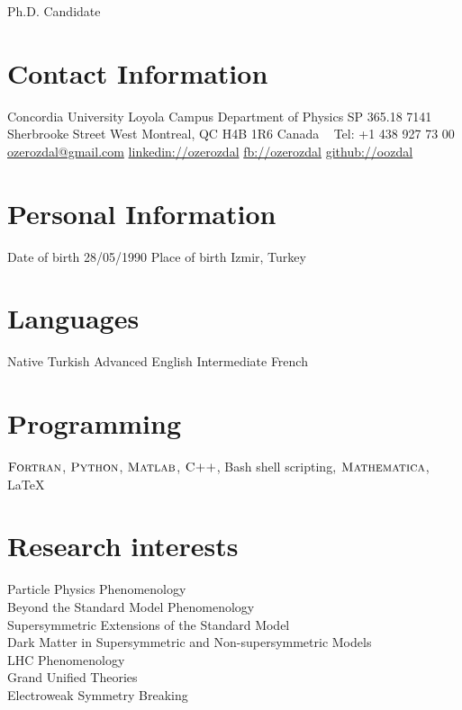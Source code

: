 \documentclass[]{friggeri-cv}
\begin{document}
       {Ph.D. Candidate}


\begin{aside}
  \section{Contact Information}
    Concordia University
    Loyola Campus
    Department of Physics SP 365.18
    7141 Sherbrooke Street West
    Montreal, QC  H4B 1R6
    Canada
    ~
    Tel: +1 438 927 73 00
    \href{mailto:ozerozdal@gmail.com}{ozerozdal@gmail.com}
    \href{http://www.linkedin.com/in/ozerozdal/}{linkedin://ozerozdal}
    \href{http://facebook.com/ozerozdal}{fb://ozerozdal}
    \href{http://github.com/oozdal}{github://oozdal}
  \section{Personal Information}
  	Date of birth 28/05/1990
  	Place of birth
  	Izmir, Turkey
  \section{Languages}
    Native Turkish
    Advanced English 
    Intermediate French
  \section{Programming}
    $\textsc{Fortran}$, $\textsc{Python}$, 
    $\textsc{Matlab}$, $\textsc{C++}$,
    Bash shell scripting,
    $\textsc{Mathematica}$, LaTeX
\end{aside}

\section{Research interests}

Particle Physics Phenomenology \\
Beyond the Standard Model Phenomenology \\
Supersymmetric Extensions of the Standard Model \\
Dark Matter in Supersymmetric and Non-supersymmetric Models \\
LHC Phenomenology \\
Grand Unified Theories \\
Electroweak Symmetry Breaking \\
\end{document}
